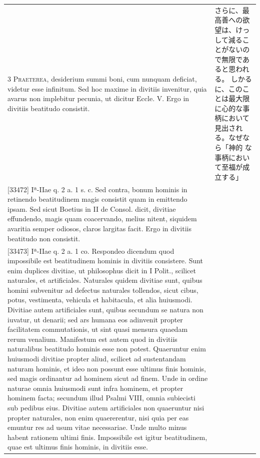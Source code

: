 \documentclass[paper=a4paper,fontsize=10pt,jafontsize=9pt,titlepage]{jlreq}
\begin{document}
\begin{longtable}{p{21em}p{21em}}
{\scshape 3 Praeterea}, desiderium summi boni, cum
 nunquam deficiat, videtur esse infinitum. Sed hoc maxime in divitiis
 invenitur, quia avarus non implebitur pecunia, ut dicitur
 Eccle. V. Ergo in divitiis beatitudo consistit.

 
&

さらに、最高善への欲望は、けっして減ることがないので無限であると思われる。
しかるに、このことは最大限に心的な事柄において見出される。なぜなら「神的
 な事柄において至福が成立する」


\\




[33472] Iª-IIae q. 2 a. 1 s. c. Sed contra, bonum hominis in retinendo
 beatitudinem magis consistit quam in emittendo ipsam. Sed sicut Boetius
 in II de Consol. dicit, divitiae effundendo, magis quam coacervando,
 melius nitent, siquidem avaritia semper odiosos, claros largitas
 facit. Ergo in divitiis beatitudo non consistit.

 
&


\\




[33473] Iª-IIae q. 2 a. 1 co. Respondeo dicendum quod impossibile est
 beatitudinem hominis in divitiis consistere. Sunt enim duplices
 divitiae, ut philosophus dicit in I Polit., scilicet naturales, et
 artificiales. Naturales quidem divitiae sunt, quibus homini subvenitur
 ad defectus naturales tollendos, sicut cibus, potus, vestimenta,
 vehicula et habitacula, et alia huiusmodi. Divitiae autem artificiales
 sunt, quibus secundum se natura non iuvatur, ut denarii; sed ars humana
 eos adinvenit propter facilitatem commutationis, ut sint quasi mensura
 quaedam rerum venalium. Manifestum est autem quod in divitiis
 naturalibus beatitudo hominis esse non potest. Quaeruntur enim
 huiusmodi divitiae propter aliud, scilicet ad sustentandam naturam
 hominis, et ideo non possunt esse ultimus finis hominis, sed magis
 ordinantur ad hominem sicut ad finem. Unde in ordine naturae omnia
 huiusmodi sunt infra hominem, et propter hominem facta; secundum illud
 Psalmi VIII, omnia subiecisti sub pedibus eius. Divitiae autem
 artificiales non quaeruntur nisi propter naturales, non enim
 quaererentur, nisi quia per eas emuntur res ad usum vitae
 necessariae. Unde multo minus habent rationem ultimi finis. Impossibile
 est igitur beatitudinem, quae est ultimus finis hominis, in divitiis
 esse.

 
&


\\





\end{longtable}
\end{document}

